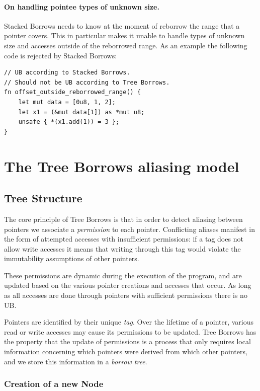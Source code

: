 \documentclass[a4paper,11pt]{article}
\theoremstyle{plain}
\theoremstyle{definition}
\theoremstyle{remark}
\begin{document}
\paragraph*{On handling pointee types of unknown size.}
Stacked Borrows needs to know at the moment of reborrow the range that a pointer
covers. This in particular makes it unable to handle types of unknown size and
accesses outside of the reborrowed range.
As an example the following code is rejected by Stacked Borrows:
\begin{lstlisting}
// UB according to Stacked Borrows.
// Should not be UB according to Tree Borrows.
fn offset_outside_reborrowed_range() {
    let mut data = [0u8, 1, 2];
    let x1 = (&mut data[1]) as *mut u8;
    unsafe { *(x1.add(1)) = 3 };
}
\end{lstlisting}

\section{The Tree Borrows aliasing model}

\subsection{Tree Structure}

The core principle of Tree Borrows is that in order to detect aliasing between
pointers we associate a \textit{permission} to each pointer. Conflicting aliases
manifest in the form of attempted accesses with insufficient permissions: if
a tag does not allow write accesses it means that writing through this tag
would violate the immutability assumptions of other pointers.

These permissions are dynamic during the execution of the program, and are
updated based on the various pointer creations and accesses that occur. As
long as all accesses are done through pointers with sufficient permissions there
is no UB.

Pointers are identified by their unique \textit{tag}. Over the lifetime of a pointer,
various read or write accesses may cause its permissions to be updated.
Tree Borrows has the property that the update of permissions is a process
that only requires local information concerning which pointers were derived from
which other pointers, and we store this information in a \textit{borrow tree}.

\subsubsection{Creation of a new Node}
\end{document}
